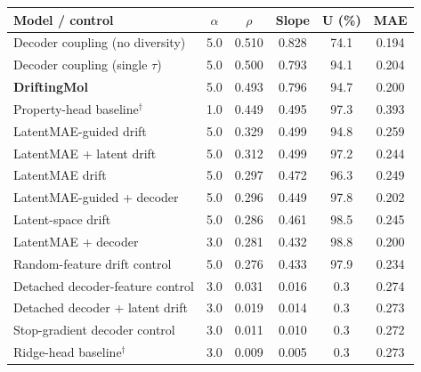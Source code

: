 \begin{tabular}{l c c c c c}
\toprule
Model / control & $\alpha$ & $\rho$ & Slope & U (\%) & MAE \\
\midrule
Decoder coupling (no diversity) & 5.0 & 0.510 & 0.828 & 74.1 & 0.194 \\
Decoder coupling (single $\tau$) & 5.0 & 0.500 & 0.793 & 94.1 & 0.204 \\
\textbf{DriftingMol} & 5.0 & 0.493 & 0.796 & 94.7 & 0.200 \\
\midrule
Property-head baseline$^\dagger$ & 1.0 & 0.449 & 0.495 & 97.3 & 0.393 \\
\midrule
LatentMAE-guided drift & 5.0 & 0.329 & 0.499 & 94.8 & 0.259 \\
LatentMAE + latent drift & 5.0 & 0.312 & 0.499 & 97.2 & 0.244 \\
LatentMAE drift & 5.0 & 0.297 & 0.472 & 96.3 & 0.249 \\
LatentMAE-guided + decoder & 5.0 & 0.296 & 0.449 & 97.8 & 0.202 \\
Latent-space drift & 5.0 & 0.286 & 0.461 & 98.5 & 0.245 \\
LatentMAE + decoder & 3.0 & 0.281 & 0.432 & 98.8 & 0.200 \\
Random-feature drift control & 5.0 & 0.276 & 0.433 & 97.9 & 0.234 \\
\midrule
Detached decoder-feature control & 3.0 & 0.031 & 0.016 & 0.3 & 0.274 \\
Detached decoder + latent drift & 3.0 & 0.019 & 0.014 & 0.3 & 0.273 \\
Stop-gradient decoder control & 3.0 & 0.011 & 0.010 & 0.3 & 0.272 \\
Ridge-head baseline$^\dagger$ & 3.0 & 0.009 & 0.005 & 0.3 & 0.273 \\
\bottomrule
\end{tabular}
